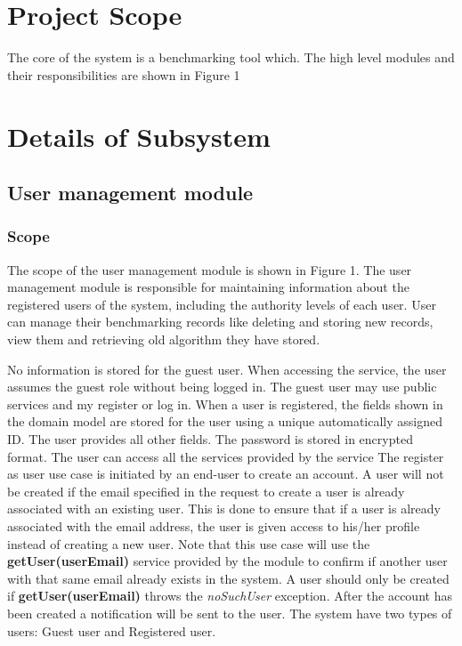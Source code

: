 \documentclass[runningheads,a4paper]{article}
\begin{document}

\section{Project Scope}
The core of the system is a benchmarking tool which. The high level modules and their responsibilities are
shown in Figure 1

\section{Details of Subsystem}
\subsection{User management module}
\subsubsection{\textbf{Scope}}\newline
\newline
The scope of the user management module is shown in Figure 1. The user
management module is responsible for maintaining information about the registered
users of the system, including the authority levels of each user. User can manage their benchmarking records like deleting and storing new records, view them and retrieving old algorithm they have stored.

\newline
\newline No information is stored for the guest user. When accessing the service, the user
assumes the guest role without being logged in. The guest user may use public
services and my register or log in.
When a user is registered, the fields shown in the domain model are stored for the
user using a unique automatically assigned ID. The user provides all other fields. The
password is stored in encrypted format. The user can access all the services provided by the service
The register as user  use case is initiated by an end-user to create an account.\newline\newline
A user will not be created if the email specified in the request to create a user is already
associated with an existing user. This is done to ensure that if a user is already associated
with the email address, the user is given access to his/her profile instead of creating a new
user.\newline\newline
Note that this use case will use the \textbf{getUser(userEmail)} service provided by the module to
confirm if another user with that same email already exists in the system. A user should
only be created if \textbf{getUser(userEmail)} throws the \textit{noSuchUser} exception.
After the account has been created a notification will be sent to the user. The system have two types of users: Guest user and Registered user.
\end{document}
